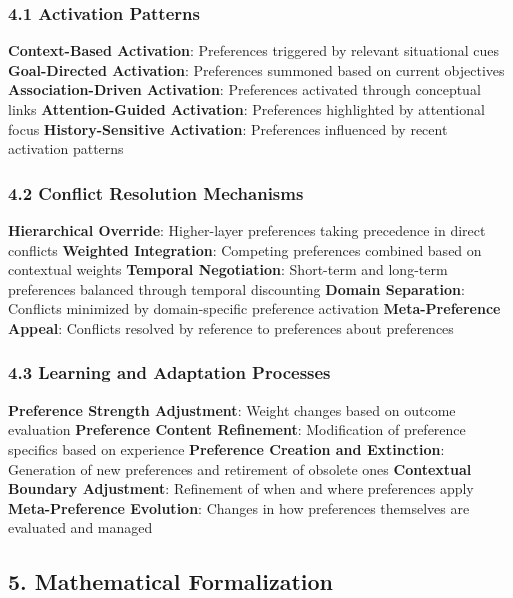 \documentclass[
]{article}
\begin{document}
\subsubsection{4.1 Activation Patterns}\label{activation-patterns}

\textbf{Context-Based Activation}: Preferences triggered by relevant
situational cues \textbf{Goal-Directed Activation}: Preferences summoned
based on current objectives \textbf{Association-Driven Activation}:
Preferences activated through conceptual links \textbf{Attention-Guided
Activation}: Preferences highlighted by attentional focus
\textbf{History-Sensitive Activation}: Preferences influenced by recent
activation patterns

\subsubsection{4.2 Conflict Resolution
Mechanisms}\label{conflict-resolution-mechanisms}

\textbf{Hierarchical Override}: Higher-layer preferences taking
precedence in direct conflicts \textbf{Weighted Integration}: Competing
preferences combined based on contextual weights \textbf{Temporal
Negotiation}: Short-term and long-term preferences balanced through
temporal discounting \textbf{Domain Separation}: Conflicts minimized by
domain-specific preference activation \textbf{Meta-Preference Appeal}:
Conflicts resolved by reference to preferences about preferences

\subsubsection{4.3 Learning and Adaptation
Processes}\label{learning-and-adaptation-processes}

\textbf{Preference Strength Adjustment}: Weight changes based on outcome
evaluation \textbf{Preference Content Refinement}: Modification of
preference specifics based on experience \textbf{Preference Creation and
Extinction}: Generation of new preferences and retirement of obsolete
ones \textbf{Contextual Boundary Adjustment}: Refinement of when and
where preferences apply \textbf{Meta-Preference Evolution}: Changes in
how preferences themselves are evaluated and managed

\subsection{5. Mathematical
Formalization}\label{mathematical-formalization}
\end{document}
